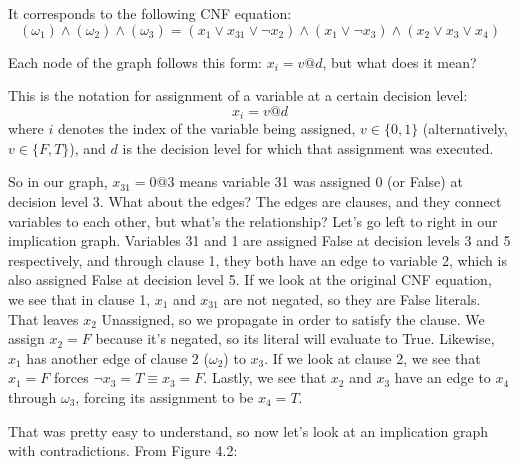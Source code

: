 \documentclass[../main.tex]{subfiles}
\begin{document}
It corresponds to the following CNF equation: 
$$ (\omega_1) \wedge (\omega_2) \wedge (\omega_3) =
(x_1 \vee x_{31} \vee \neg x_2) \wedge (x_1 \vee \neg x_3) \wedge (x_2 \vee x_3 \vee x_4)$$

Each node of the graph follows this form: $x_i = v @ d$, but what does it mean?

\begin{center}
    This is the notation for assignment of a variable at a certain decision level:
    $$x_i = v@d$$
    where $i$ denotes the index of the variable being assigned, $v \in \{0, 1\}$
    (alternatively, $v \in \{F, T\}$), and $d$ is the decision level for which that 
    assignment was executed.
\end{center}

So in our graph, $x_{31} = 0 @ 3$ means variable 31 was assigned 0 (or False) at
decision level 3. What about the edges? The edges are clauses, and they connect
variables to each other, but what's the relationship? Let's go left to right in our 
implication graph. Variables 31 and 1 are assigned False at decision levels 3 and 5
respectively, and through clause 1, they both have an edge to variable 2, which is also 
assigned False at decision level 5. If we look at the original CNF equation, we see that 
in clause 1, $x_1$ and $x_{31}$ are not negated, so they are False literals. That leaves 
$x_2$ Unassigned, so we propagate in order to satisfy the clause. We assign $x_2 = F$ 
because it's negated, so its literal will evaluate to True. Likewise, $x_1$ has another 
edge of clause 2 ($\omega_2$) to $x_3$. If we look at clause 2, we see that $x_1 = F$ 
forces $\neg x_3 = T \equiv x_3 = F$. Lastly, we see that $x_2$ and $x_3$ have an edge 
to $x_4$ through $\omega_3$, forcing its assignment to be $x_4 = T$.

That was pretty easy to understand, so now let's look at an implication graph with 
contradictions. From Figure 4.2:
\end{document}
